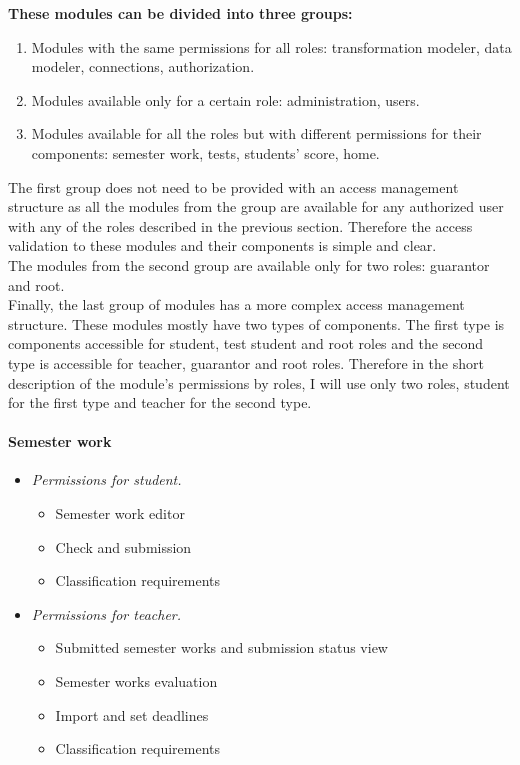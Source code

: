 \noindent \textbf{These modules can be divided into three groups:}

\begin{enumerate}
    \item Modules with the same permissions for all roles: transformation modeler, data modeler, connections, authorization.
    \item Modules available only for a certain role: administration, users.
    \item Modules available for all the roles but with different permissions for their components: semester work, tests, students' score, home.
\end{enumerate}

\noindent The first group does not need to be provided with an access management structure as all the modules from the group are available for any authorized user with any of the roles described in the previous section. Therefore the access validation to these modules and their components is simple and clear.\\
The modules from the second group are available only for two roles: guarantor and root.\\
Finally, the last group of modules has a more complex access management structure. These modules mostly have two types of components. The first type is components accessible for student, test student and root roles and the second type is accessible for teacher, guarantor and root roles. Therefore in the short description of the module's permissions by roles, I will use only two roles, student for the first type and teacher for the second type.

\paragraph*{Semester work}
\begin{itemize}
    \item \emph{Permissions for student.} 
        \begin{itemize}
            \item Semester work editor
            \item Check and submission
            \item Classification requirements
        \end{itemize}
    \item \emph{Permissions for teacher.}
        \begin{itemize}
            \item Submitted semester works and submission status view
            \item Semester works evaluation
            \item Import and set deadlines
            \item Classification requirements
        \end{itemize}
\end{itemize}

